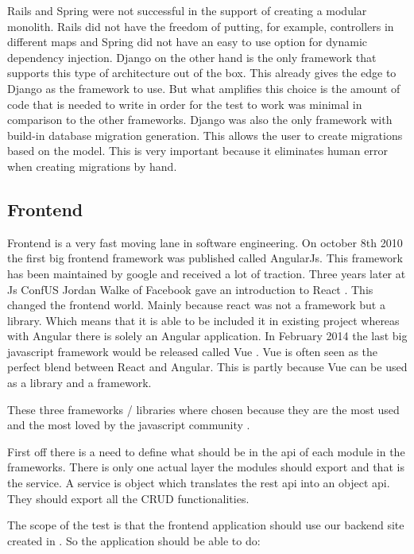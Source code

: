 Rails and Spring were not successful in the support of creating a modular monolith. Rails did not have the freedom of putting, for example, controllers in different maps and Spring did not have an easy to use option for dynamic dependency injection. Django on the other hand is the only framework that supports this type of architecture out of the box. This already gives the edge to Django as the framework to use. But what amplifies this choice is the amount of code that is needed to write in order for the test to work was minimal in comparison to the other frameworks. Django was also the only framework with build-in database migration generation. This allows the user to create migrations based on the model. This is very important because it eliminates human error when creating migrations by hand.

\subsection{Frontend}
\label{sec:Frontend}

Frontend is a very fast moving lane in software engineering. On october 8th 2010 \cite{angularJs} the first big frontend framework was published called AngularJs. This framework has been maintained by google and received a lot of traction. Three years later at Js ConfUS Jordan Walke of Facebook gave an introduction to React \cite{reactJs}. This changed the frontend world. Mainly because react was not a framework but a library. Which means that it is able to be included it in existing project whereas with Angular there is solely an Angular application. In February 2014 the last big javascript framework would be released called Vue \cite{vueJs}. Vue is often seen as the perfect blend between React and Angular. This is partly because Vue can be used as a library and a framework.

These three frameworks / libraries where chosen because they are the most used and the most loved by the javascript community \cite{allFrontendFrameworks}.

First off there is a need to define what should be in the api of each module in the frameworks. There is only one actual layer the modules should export and that is the service. A service is object which translates the rest api into an object api. They should export all the CRUD functionalities.

The scope of the test is that the frontend application should use our backend site created in . So the application should be able to do:

